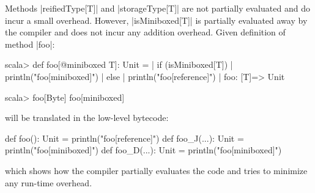 Methods |reifiedType[T]| and |storageType[T]| are not partially evaluated and do incur a small overhead. However, |isMiniboxed[T]| is partially evaluated away by the compiler and does not incur any addition overhead. Given definition of method |foo|:

\begin{lstlisting-nobreak}
scala> def foo[@miniboxed T]: Unit = {
    |   if (isMiniboxed[T])
    |     println("foo[miniboxed]")
    |   else
    |     println("foo[reference]")
    | }
	foo: [T]=> Unit

scala> foo[Byte]
	foo[miniboxed]
\end{lstlisting-nobreak}

will be translated in the low-level bytecode:

\begin{lstlisting-nobreak}
def foo(): Unit = println("foo[reference]")
def foo_J(...): Unit = println("foo[miniboxed]")
def foo_D(...): Unit = println("foo[miniboxed]")
\end{lstlisting-nobreak}

which shows how the compiler partially evaluates the code and tries to minimize any run-time overhead.